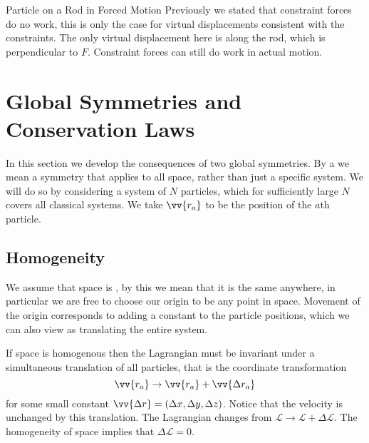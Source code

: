 \documentclass[fleqn]{NotesClass}
\newcommand*{\lagrangian}{\mathcal{L}}
\begin{document}
\begin{exm}{Particle on a Rod in Forced Motion}{}
        Previously we stated that constraint forces do no work, this is only the case for virtual displacements consistent with the constraints.
        The only virtual displacement here is along the rod, which is perpendicular to \(F\).
        Constraint forces can still do work in actual motion.
    \end{exm}
    
    \section{Global Symmetries and Conservation Laws}
    In this section we develop the consequences of two global symmetries.
    By a  we mean a symmetry that applies to all space, rather than just a specific system.
    We will do so by considering a system of \(N\) particles, which for sufficiently large \(N\) covers all classical systems.
    We take \(\vv{r_a}\) to be the position of the \(a\)th particle.
    
    \subsection{Homogeneity}
    We assume that space is , by this we mean that it is the same anywhere, in particular we are free to choose our origin to be any point in space.
    Movement of the origin corresponds to adding a constant to the particle positions, which we can also view as translating the entire system.
    
    If space is homogenous then the Lagrangian must be invariant under a simultaneous translation of all particles, that is the coordinate transformation
    \begin{equation}
        \vv{r_a} \to \vv{r_a} + \vv{\Delta r_a}
    \end{equation}
    for some small constant \(\vv{\Delta r} = (\Delta x, \Delta y, \Delta z)\).
    Notice that the velocity is unchanged by this translation.
    The Lagrangian changes from \(\lagrangian \to \lagrangian + \Delta\lagrangian\).
    The homogeneity of space implies that \(\Delta\lagrangian = 0\).
    
\end{document}
